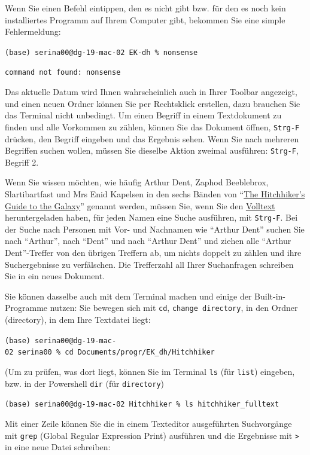 \documentclass[
  letterpaper,
]{book}
\begin{document}
Wenn Sie einen Befehl eintippen, den es nicht gibt bzw. für den es noch
kein installiertes Programm auf Ihrem Computer gibt, bekommen Sie eine
simple Fehlermeldung:

\texttt{(base)\ serina00@dg-19-mac-02\ EK-dh\ \%\ nonsense}

\texttt{command\ not\ found:\ nonsense}

Das aktuelle Datum wird Ihnen wahrscheinlich auch in Ihrer Toolbar
angezeigt, und einen neuen Ordner können Sie per Rechtsklick erstellen,
dazu brauchen Sie das Terminal nicht unbedingt. Um einen Begriff in
einem Textdokument zu finden und alle Vorkommen zu zählen, können Sie
das Dokument öffnen, \texttt{Strg-F} drücken, den Begriff eingeben und
das Ergebnis sehen. Wenn Sie nach mehreren Begriffen suchen wollen,
müssen Sie dieselbe Aktion zweimal ausführen: \texttt{Strg-F}, Begriff
2.

Wenn Sie wissen möchten, wie häufig Arthur Dent, Zaphod Beeblebrox,
Slartibartfast und Mrs Enid Kapelsen in den sechs Bänden von
``\href{https://en.wikipedia.org/wiki/The_Hitchhiker\%27s_Guide_to_the_Galaxy}{The
Hitchhiker's Guide to the Galaxy}'' genannt werden, müssen Sie, wenn Sie
den
\href{https://archive.org/stream/TheultimateHitchhikersGuide/The\%20Hitchhiker\%27s\%20Guide\%20To\%20The\%20Galaxy_djvu.txt}{Volltext}
heruntergeladen haben, für jeden Namen eine Suche ausführen, mit
\texttt{Strg-F}. Bei der Suche nach Personen mit Vor- und Nachnamen wie
``Arthur Dent'' suchen Sie nach ``Arthur'', nach ``Dent'' und nach
``Arthur Dent'' und ziehen alle ``Arthur Dent''-Treffer von den übrigen
Treffern ab, um nichts doppelt zu zählen und ihre Suchergebnisse zu
verfälschen. Die Trefferzahl all Ihrer Suchanfragen schreiben Sie in ein
neues Dokument.

Sie können dasselbe auch mit dem Terminal machen und einige der
Built-in-Programme nutzen: Sie bewegen sich mit \texttt{cd},
\texttt{change\ directory}, in den Ordner (directory), in dem Ihre
Textdatei liegt:

\texttt{(base)\ serina00@dg-19-mac-02\ serina00\ \%\ cd\ Documents/progr/EK\_dh/Hitchhiker}

(Um zu prüfen, was dort liegt, können Sie im Terminal \texttt{ls} (für
\texttt{list}) eingeben, bzw. in der Powershell \texttt{dir} (für
\texttt{directory})

\texttt{(base)\ serina00@dg-19-mac-02\ Hitchhiker\ \%\ ls\ hitchhiker\_fulltext}

Mit einer Zeile können Sie die in einem Texteditor ausgeführten
Suchvorgänge mit \texttt{grep} (Global Regular Expression Print)
ausführen und die Ergebnisse mit \texttt{\textgreater{}} in eine neue
Datei schreiben:
\end{document}
